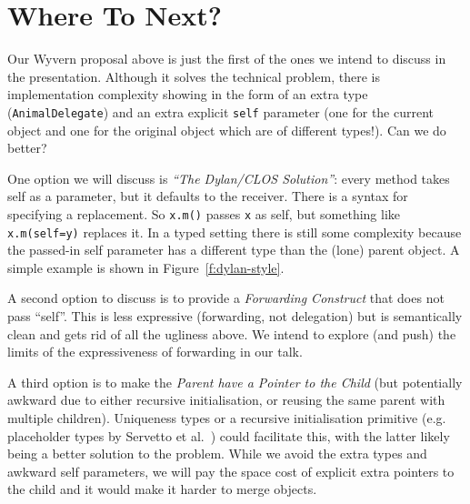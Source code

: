 \documentclass[preprint]{sigplanconf}
\begin{document}

\section{Where To Next?}



Our Wyvern proposal above is just the first of the ones we intend to discuss in the presentation.  Although it solves the technical problem, there is implementation complexity showing in the form of an extra type (\texttt{AnimalDelegate}) and an extra explicit \texttt{self} parameter (one for the current object and one for the original object which are of different types!). Can we do better?

One option we will discuss is \textit{``The Dylan/CLOS Solution''}: every method takes self as a parameter, but it defaults to the receiver. There is a syntax for specifying a replacement. So \texttt{x.m()} passes \texttt{x} as self, but something like \texttt{x.m(self=y)} replaces it. In a typed setting there is still some complexity because the passed-in self parameter has a different type than the (lone) parent object. A simple example is shown in Figure~\ref{f:dylan-style}.

A second option to discuss is to provide a \textit{Forwarding Construct} that does not pass ``self''. This is less expressive (forwarding, not delegation) but is semantically clean and gets rid of all the ugliness above. We intend to explore (and push) the limits of the expressiveness of forwarding in our talk.


A third option is to make the \textit{Parent have a Pointer to the Child} (but potentially awkward due to either recursive initialisation, or reusing the same parent with multiple children). Uniqueness types or a recursive initialisation primitive (e.g. placeholder types by Servetto et al.~\cite{servetto:2013:billion}) could facilitate this, with the latter likely being a better solution to the problem. While we avoid the extra types and awkward self parameters, we will pay the space cost of explicit extra pointers to the child and it would make it harder to merge objects.
\end{document}
